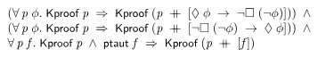\documentclass{report}
\renewcommand{\HOLConst}[1]{{\textsf{\upshape\small #1}}}
\newenvironment{holmath}{\begin{displaymath}\begin{array}{l}}{\end{array}\end{displaymath}\ignorespacesafterend}
\begin{document}
\begin{holmath}
\;\;\;\;\;(\HOLSymConst{\HOLTokenForall{}}\HOLBoundVar{p}\;\HOLBoundVar{\ensuremath{\phi}}.\;\HOLConst{Kproof}\;\HOLBoundVar{p}\;\HOLSymConst{\HOLTokenImp{}}\;\HOLConst{Kproof}\;(\HOLBoundVar{p}\;\HOLSymConst{\HOLTokenDoublePlus}\;[\HOLSymConst{\ensuremath{\Diamond}}\;\HOLBoundVar{\ensuremath{\phi}}\;\HOLSymConst{\ensuremath{\rightarrow}}\;\HOLSymConst{\HOLTokenNeg{}}\HOLSymConst{\ensuremath{\Box}}\;(\HOLSymConst{\HOLTokenNeg{}}\HOLBoundVar{\ensuremath{\phi}})]))\;\HOLSymConst{\HOLTokenConj{}}\\
\;\;\;\;\;(\HOLSymConst{\HOLTokenForall{}}\HOLBoundVar{p}\;\HOLBoundVar{\ensuremath{\phi}}.\;\HOLConst{Kproof}\;\HOLBoundVar{p}\;\HOLSymConst{\HOLTokenImp{}}\;\HOLConst{Kproof}\;(\HOLBoundVar{p}\;\HOLSymConst{\HOLTokenDoublePlus}\;[\HOLSymConst{\HOLTokenNeg{}}\HOLSymConst{\ensuremath{\Box}}\;(\HOLSymConst{\HOLTokenNeg{}}\HOLBoundVar{\ensuremath{\phi}})\;\HOLSymConst{\ensuremath{\rightarrow}}\;\HOLSymConst{\ensuremath{\Diamond}}\;\HOLBoundVar{\ensuremath{\phi}}]))\;\HOLSymConst{\HOLTokenConj{}}\\
\;\;\;\;\;\HOLSymConst{\HOLTokenForall{}}\HOLBoundVar{p}\;\HOLBoundVar{f}.\;\HOLConst{Kproof}\;\HOLBoundVar{p}\;\HOLSymConst{\HOLTokenConj{}}\;\HOLConst{ptaut}\;\HOLBoundVar{f}\;\HOLSymConst{\HOLTokenImp{}}\;\HOLConst{Kproof}\;(\HOLBoundVar{p}\;\HOLSymConst{\HOLTokenDoublePlus}\;[\HOLBoundVar{f}])
\end{holmath}
\end{document}
